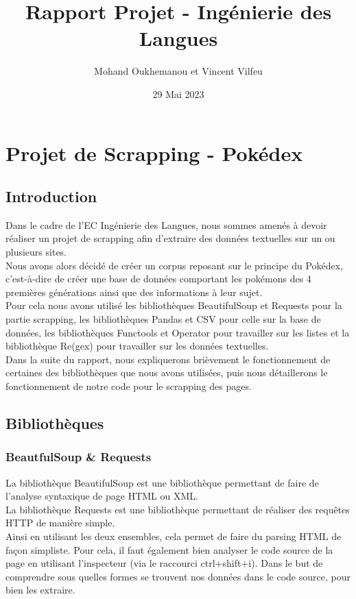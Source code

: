 \documentclass[a4paper, titlepage]{report}
\title{Rapport Projet - Ingénierie des Langues}
\author{Mohand Oukhemanou et Vincent Vilfeu}
\date{29 Mai 2023}
\begin{document}
\maketitle
\chapter*{Projet de Scrapping - Pokédex}
\section*{Introduction}

\textnormal{Dans le cadre de l’EC Ingénierie des Langues, nous sommes amenés à devoir réaliser un projet de scrapping afin d'extraire des données textuelles sur un ou plusieurs sites.\\
Nous avons alors décidé de créer un corpus reposant sur le principe du Pokédex, c'est-à-dire de créer une base de données comportant les pokémons des 4 premières générations ainsi que des informations à leur sujet.\\
Pour cela nous avons utilisé les bibliothèques BeautifulSoup et Requests pour la partie scrapping, les bibliothèques Pandas et CSV pour celle sur la base de données, les bibliothèques Functools et Operator pour travailler sur les listes et la bibliothèque Re(gex) pour travailler sur les données textuelles.\\
Dans la suite du rapport, nous expliquerons brièvement le fonctionnement de certaines des bibliothèques que nous avons utilisées, puis nous détaillerons le fonctionnement de notre code pour le scrapping des pages.\\}


\section*{Bibliothèques}

\subsection*{BeautfulSoup \& Requests}
\textnormal{La bibliothèque BeautifulSoup est une bibliothèque permettant de faire de l'analyse syntaxique de page HTML ou XML.\\
La bibliothèque Requests est une bibliothèque permettant de réaliser des requêtes HTTP de manière simple.\\
Ainsi en utilisant les deux ensembles, cela permet de faire du parsing HTML de façon simpliste. Pour cela, il faut également bien analyser le code source de la page en utilisant l'inspecteur (via le raccourci ctrl+shift+i). Dans le but de comprendre sous quelles formes se trouvent nos données dans le code source, pour bien les extraire.}
\end{document}
